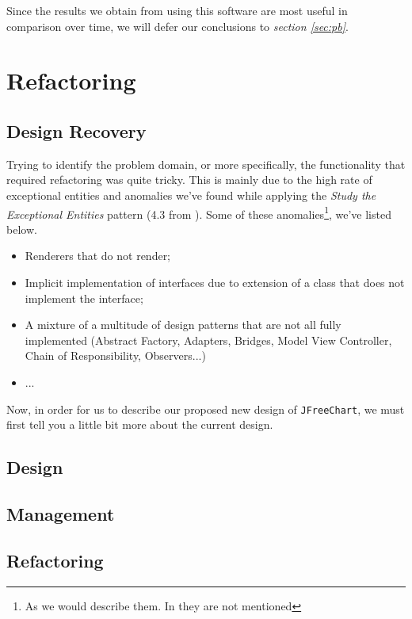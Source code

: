 \documentclass[11pt]{article}
\begin{document}
	Since the results we obtain from using this software are most useful in comparison over time, we will defer our conclusions to \textsl{section \ref{sec:pb}}.
	
	
	\section{Refactoring}
	\subsection{Design Recovery}
	Trying to identify the problem domain, or more specifically, the functionality that required refactoring was quite tricky. This is mainly due to the high rate of exceptional entities and anomalies we've found while applying the \textsl{Study the Exceptional Entities} pattern (4.3 from \cite{demeyer2009object}). Some of these anomalies\footnote{As we would describe them. In \cite{demeyer2009object} they are not mentioned}, we've listed below.
	\begin{itemize}
		\item Renderers that do not render;
		\item Implicit implementation of interfaces due to extension of a class that does not implement the interface;
		\item A mixture of a multitude of design patterns that are not all fully implemented (Abstract Factory, Adapters, Bridges, Model View Controller, Chain of Responsibility, Observers...)
		\item ...
	\end{itemize}

	Now, in order for us to describe our proposed new design of \texttt{JFreeChart}, we must first tell you a little bit more about the current design.

	\subsection{Design}
	\subsection{Management}
	\subsection{Refactoring}
	
\end{document}
